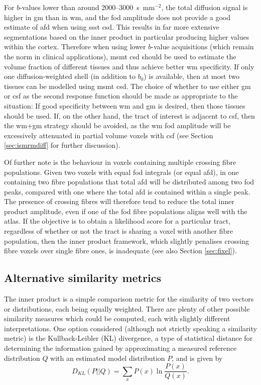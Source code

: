 For $b$-values lower than around 2000--3000~s~mm$^{-2}$, the total diffusion signal is higher in \gls{gm} than in \gls{wm}, and the \gls{fod} amplitude does not provide a good estimate of \gls{afd} when using \gls{ssst} \gls{csd}.
This results in far more extensive segmentations based on the inner product in particular producing higher values within the cortex.
Therefore when using lower $b$-value acquisitions (which remain the norm in clinical applications), \gls{msmt} \gls{csd} should be used to estimate the volume fraction of different tissues and thus achieve better \gls{wm} specificity.
If only one diffusion-weighted shell (in addition to $b_0$) is available, then at most two tissues can be modelled using \gls{msmt} \gls{csd}.
The choice of whether to use either \gls{gm} or \gls{csf} as the second response function should be made as appropriate to the situation: If good specificity between \gls{wm} and \gls{gm} is desired, then those tissues should be used.
If, on the other hand, the tract of interest is adjacent to \gls{csf}, then the \gls{wm}+\gls{gm} strategy should be avoided, as the \gls{wm} \gls{fod} amplitude will be excessively attenuated in partial volume voxels with \gls{csf} (see Section \ref{sec:ismrmdiff} for further discussion).

Of further note is the behaviour in voxels containing multiple crossing fibre populations.
Given two voxels with equal \gls{fod} integrals (or equal \gls{afd}), in one containing two fibre populations that total \gls{afd} will be distributed among two \gls{fod} peaks, compared with one where the total \gls{afd} is contained within a single peak.
The presence of crossing fibres will therefore tend to reduce the total inner product amplitude, even if one of the \gls{fod} fibre populations aligns well with the atlas.
If the objective is to obtain a likelihood score for a particular tract, regardless of whether or not the tract is sharing a voxel with another fibre population, then the inner product framework, which slightly penalises crossing fibre voxels over single fibre ones, is inadequate (see also Section \ref{sec:fixel}). %

\subsection{Alternative similarity metrics}

The inner product is a simple comparison metric for the similarity of two vectors or distributions, each being equally weighted.
There are plenty of other possible similarity measures which could be computed, each with slightly different interpretations.
One option considered (although not strictly speaking a similarity metric) is the Kullback-Leibler (KL) divergence, a type of statistical distance for determining the information gained by approximating a measured reference distribution $Q$ with an estimated model distribution $P$, and is given by
\begin{equation}
  D_{KL}(P||Q) = \sum_x P(x) \ln \frac{P(x)}{Q(x)}. \label{eq:kl}
\end{equation}

